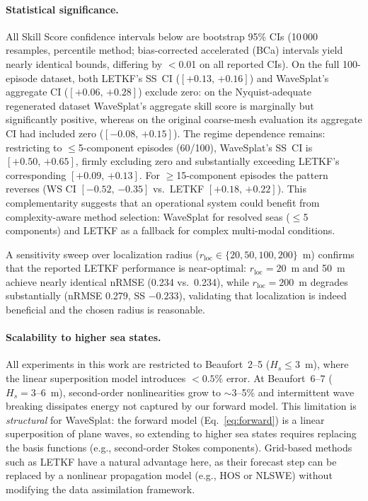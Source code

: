 \paragraph{Statistical significance.}
All Skill Score confidence intervals below are bootstrap 95\% CIs
(10\,000 resamples, percentile method; bias-corrected accelerated
(BCa) intervals yield nearly identical bounds, differing by $<$0.01
on all reported CIs).
On the full 100-episode dataset, both LETKF's SS~CI
($[{+0.13},\,{+0.16}]$) and WaveSplat's aggregate CI
($[{+0.06},\,{+0.28}]$) exclude zero: on the Nyquist-adequate
regenerated dataset WaveSplat's aggregate skill score is marginally but
significantly positive, whereas on the original coarse-mesh evaluation its
aggregate CI had included zero ($[{-0.08},\,{+0.15}]$).  The regime
dependence remains: restricting to $\leq$5-component
episodes (60/100), WaveSplat's SS~CI is $[{+0.50},\,{+0.65}]$, firmly
excluding zero and substantially exceeding LETKF's corresponding
$[{+0.09},\,{+0.13}]$.  For $\geq$15-component episodes the pattern
reverses (WS CI $[{-0.52},\,{-0.35}]$ vs.\ LETKF $[{+0.18},\,{+0.22}]$).
This complementarity suggests that an operational system could benefit
from complexity-aware method selection: WaveSplat for resolved seas
($\leq$5 components) and LETKF as a fallback for complex multi-modal
conditions.

A sensitivity sweep over localization radius ($r_{\text{loc}} \in
\{20, 50, 100, 200\}$~m) confirms that the reported LETKF performance
is near-optimal: $r_{\text{loc}}=20$~m and 50~m achieve nearly identical
nRMSE (0.234 vs.\ 0.234), while $r_{\text{loc}}=200$~m degrades
substantially (nRMSE 0.279, SS $-0.233$), validating that localization
is indeed beneficial and the chosen radius is reasonable.

\paragraph{Scalability to higher sea states.}
All experiments in this work are restricted to Beaufort~2--5
($H_s \leq 3$~m), where the linear superposition model introduces
$<0.5\%$ error.  At Beaufort~6--7 ($H_s = 3$--6~m), second-order
nonlinearities grow to $\sim$3--5\% and intermittent wave breaking
dissipates energy not captured by our forward model.  This limitation
is \emph{structural} for WaveSplat: the forward model
(Eq.~\ref{eq:forward}) is a linear superposition of plane waves, so
extending to higher sea states requires replacing the basis functions
(e.g., second-order Stokes components).  Grid-based methods such as
LETKF have a natural advantage here, as their forecast step can be
replaced by a nonlinear propagation model (e.g., HOS or NLSWE) without
modifying the data assimilation framework.

